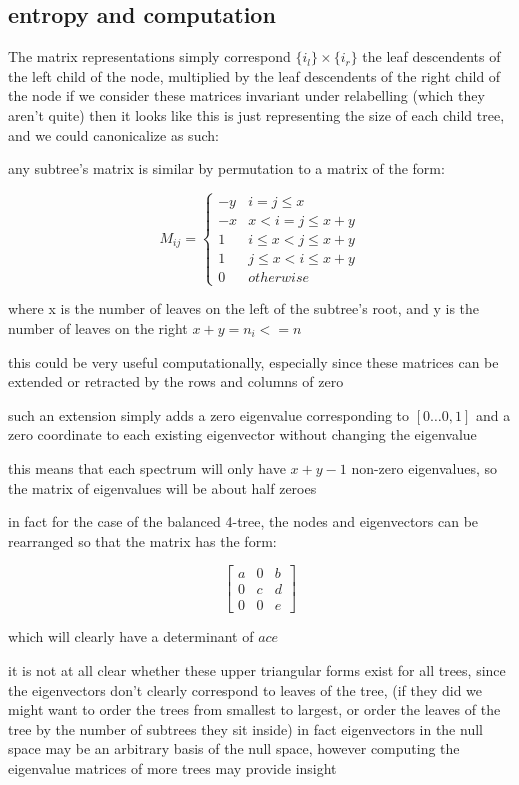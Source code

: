 \documentclass{report}
\begin{document}
\subsection{entropy and computation}

The matrix representations simply correspond $\{i_l\} \times \{i_r\}$
the leaf descendents of the left child of the node,
multiplied by the leaf descendents of the right child of the node
if we consider these matrices invariant under relabelling (which they aren't
quite) then it looks like this is just representing the size of each child
tree, and we could canonicalize as such:

any subtree's matrix is similar by permutation to a matrix of the form:

\[ M_{ij} = \begin{cases}
-y & i = j \leq x\\
-x & x < i = j \leq x + y\\
1 & i \leq x < j \leq x + y\\
1 & j \leq x < i \leq x + y\\
0 & otherwise
\end{cases}
\]

where x is the number of leaves on the left of the subtree's root,
and y is the number of leaves on the right
$x + y = n_i <= n$

this could be very useful computationally, especially since these matrices can
be extended or retracted by the rows and columns of zero

such an extension simply adds a zero eigenvalue corresponding to
$[0\ldots 0, 1]$
and a zero coordinate to each existing eigenvector without changing the
eigenvalue

this means that each spectrum will only have $x + y - 1$ non-zero eigenvalues,
so the matrix of eigenvalues will be about half zeroes

in fact for the case of the balanced 4-tree, the nodes and eigenvectors can be
rearranged so that the matrix has the form:

\begin{equation*}
\left[ \begin{matrix}
a & 0 & b\\
0 & c & d\\
0 & 0 & e
\end{matrix} \right]
\end{equation*}

which will clearly have a determinant of $ace$

it is not at all clear whether these upper triangular forms exist for all
trees, since the eigenvectors don't clearly correspond to leaves of the tree,
(if they did we might want to order the trees from smallest to largest, or
order the leaves of the tree by the number of subtrees they sit inside)
in fact eigenvectors in the null space may be an arbitrary basis of the null
space, however computing the eigenvalue matrices of more trees may provide
insight
\end{document}
